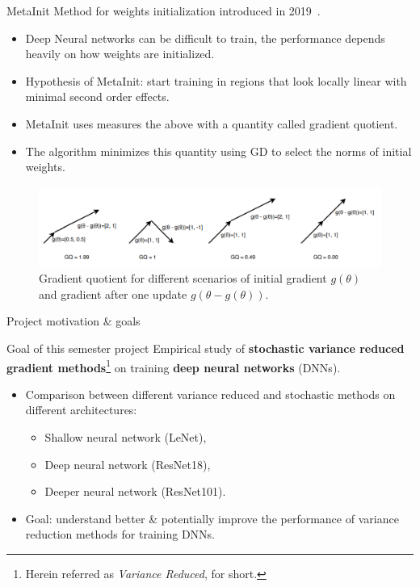 \documentclass[10pt]{beamer}
\begin{document}
\begin{frame}{MetaInit}
    Method for weights initialization introduced in 2019~\citep{NEURIPS2019_876e8108}.
    \begin{itemize}
        \item Deep Neural networks can be difficult to train, the performance depends heavily on how weights are initialized.
        \item Hypothesis of MetaInit: start training in regions that look locally linear with minimal second order effects.
        \item MetaInit uses measures the above with a quantity called gradient quotient.
        \item The algorithm minimizes this quantity using GD to select the norms of initial weights.
    \end{itemize}
    \begin{figure}
        \centering
        \includegraphics[width=.8\textwidth]{report/figures/MetaInit.png}
        \caption{Gradient quotient for different scenarios of initial gradient $g(\theta)$ and gradient after one update $g(\theta - g(\theta))$.}
        \label{fig:GQexample}
    \end{figure}
\end{frame}

\begin{frame}{ }
    \begin{center}
        \Huge Project motivation \& goals
    \end{center}
\end{frame}

\begin{frame}{Goal of this semester project}
    Empirical study of  \textbf{stochastic variance reduced gradient methods}\footnote{Herein referred as \textit{Variance Reduced},  for short. } on  training \textbf{deep neural networks} (DNNs).
    \newline
    \begin{itemize}
        \item Comparison between different variance reduced and stochastic methods on different architectures:
        \begin{itemize}
            \item Shallow neural network (LeNet),
            \item Deep neural network (ResNet18),
            \item Deeper neural network (ResNet101).
        \end{itemize}
        \item Goal: understand better \& potentially improve the performance of variance reduction methods for training DNNs. 
    \end{itemize}
\end{frame}
\end{document}
